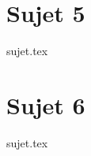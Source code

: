 \documentclass[a4paper, 11pt, oneside]{book}
\begin{document}
\resetQ
\newpage
\chapter{Sujet 5}
{sujet.tex}

\resetQ
\newpage
\chapter{Sujet 6}
{sujet.tex}
\end{document}

